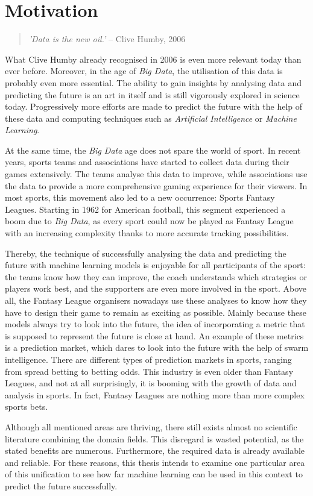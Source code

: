 \section{Motivation}

\begin{quote}
    \begin{center}
        \emph{'Data is the new oil.'}   -- Clive Humby, 2006
    \end{center}
\end{quote}

What Clive Humby already recognised in 2006 is even more relevant today than ever before. Moreover, in the age of \emph{Big Data}, the utilisation of this data is probably even more essential. The ability to gain insights by analysing data and predicting the future is an art in itself and is still vigorously explored in science today. Progressively more efforts are made to predict the future with the help of these data and computing techniques such as \emph{Artificial Intelligence} or \emph{Machine Learning}.

At the same time, the \emph{Big Data} age does not spare the world of sport. \parencite[cf.][]{rein_big_2016} In recent years, sports teams and associations have started to collect data during their games extensively. The teams analyse this data to improve, while associations use the data to provide a more comprehensive gaming experience for their viewers. In most sports, this movement also led to a new occurrence: Sports Fantasy Leagues. Starting in 1962 for American football, this segment experienced a boom due to \emph{Big Data}, as every sport could now be played as Fantasy League with an increasing complexity thanks to more accurate tracking possibilities.

\clearpage Thereby, the technique of successfully analysing the data and predicting the future with machine learning models is enjoyable for all participants of the sport: the teams know how they can improve, the coach understands which strategies or players work best, and the supporters are even more involved in the sport. Above all, the Fantasy League organisers nowadays use these analyses to know how they have to design their game to remain as exciting as possible. Mainly because these models always try to look into the future, the idea of incorporating a metric that is supposed to represent the future is close at hand. An example of these metrics is a prediction market, which dares to look into the future with the help of swarm intelligence. There are different types of prediction markets in sports, ranging from spread betting to betting odds. This industry is even older than Fantasy Leagues, and not at all surprisingly, it is booming with the growth of data and analysis in sports. In fact, Fantasy Leagues are nothing more than more complex sports bets. 

Although all mentioned areas are thriving, there still exists almost no scientific literature combining the domain fields. This disregard is wasted potential, as the stated benefits are numerous. Furthermore, the required data is already available and reliable. For these reasons, this thesis intends to examine one particular area of this unification to see how far machine learning can be used in this context to predict the future successfully. 